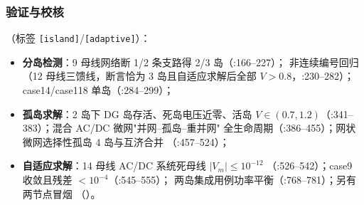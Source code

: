 \subsubsection*{验证与校核}
（标签 \texttt{[island]}/\texttt{[adaptive]}）：
\begin{itemize}
  \item \textbf{分岛检测}：9 母线网络断 1/2 条支路得 2/3 岛（:166--227）；
        非连续编号回归（12 母线三馈线，断言恰为 3 岛且自适应求解后全部
        $V>0.8$，:230--282）；case14/case118 单岛（:284--299）；
  \item \textbf{孤岛求解}：2 岛下 DG 岛存活、死岛电压近零、活岛
        $V\in(0.7,1.2)$（:341--383）；混合 AC/DC 微网"并网--孤岛--重并网"
        全生命周期（:386--455）；网状微网选择性孤岛 4 岛与互济合并
        （:457--524）；
  \item \textbf{自适应求解}：14 母线 AC/DC 系统死母线 $|V_m|\le10^{-12}$
        （:526--542）；case9 收敛且残差 $<10^{-4}$（:545--555）；
        两岛集成用例功率平衡（:768--781）；另有两节点冒烟
        （）。
\end{itemize}
